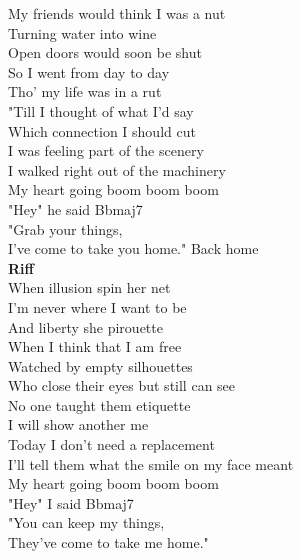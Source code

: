    My friends would think I was a nut\\
   Turning water into wine\\
   Open doors would soon be shut\\
   So I went from day to day\\
   Tho' my life was in a rut\\
   "Till I thought of what I'd say\\
   Which connection I should cut\\
I was feeling part of the scenery\\
I walked right out of the machinery\\
My heart going  boom boom boom\\
"Hey" he  said   {Bbmaj7}\\
"Grab your things,\\
I've come to take you home." Back home\\
\textbf{Riff}\\
   When illusion spin her net\\
   I'm never where I want to be\\
   And liberty she pirouette\\
   When I think that I am free\\
   Watched by empty silhouettes\\
   Who close their eyes but still can see\\
   No one taught them etiquette\\
   I will show another me\\
Today I don't need a replacement\\
I'll tell them what the smile on my face meant\\
My heart going  boom boom boom\\
"Hey" I  said   {Bbmaj7}\\
"You can keep my things,\\
They've come to take me home."\\

